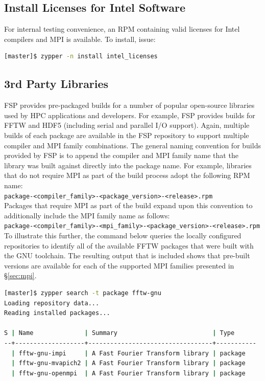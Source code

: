 \documentclass[letterpaper]{article}
\begin{document}
\subsection{Install Licenses for Intel Software}

For internal testing convenience, an RPM containing valid licenses for Intel
compilers and MPI is available. To install, issue:

\begin{lstlisting}[language=bash,keywords={},upquote=true]
[master]$ zypper -n install intel_licenses
\end{lstlisting}

\subsection{3rd Party Libraries}

FSP provides pre-packaged builds for a number of popular open-source libraries
used by HPC applications and developers. For example, FSP provides builds for
FFTW and HDF5 (including serial and parallel I/O support). Again, multiple
builds of each package are available in the FSP repository to support multiple
compiler and MPI family combinations. The general naming convention for builds
provided by FSP is to append the compiler and MPI family name that the library
was built against directly into the package name. For example, libraries that
do not require MPI as part of the build process adopt the following RPM
name: \\

\noindent
\texttt{package-<compiler\_family>-<package\_version>-<release>.rpm} \\

\noindent Packages that require MPI as part of the build expand upon this convention to
additionally include the MPI family name as follows: \\

\noindent
\texttt{package-<compiler\_family>-<mpi\_family>-<package\_version>-<release>.rpm} \\

To illustrate this further, the command below queries the locally configured
repositories to identify all of the available FFTW packages that were built
with the GNU toolchain. The resulting output that is included shows that
pre-built versions are available for each of the supported MPI families
presented in \S\ref{sec:mpi}.

\begin{lstlisting}[language=bash]
[master]$ zypper search -t package fftw-gnu
Loading repository data...
Reading installed packages...

S | Name              | Summary                          | Type      
--+-------------------+----------------------------------+-----------
  | fftw-gnu-impi     | A Fast Fourier Transform library | package   
  | fftw-gnu-mvapich2 | A Fast Fourier Transform library | package   
  | fftw-gnu-openmpi  | A Fast Fourier Transform library | package   
\end{lstlisting}
\end{document}
